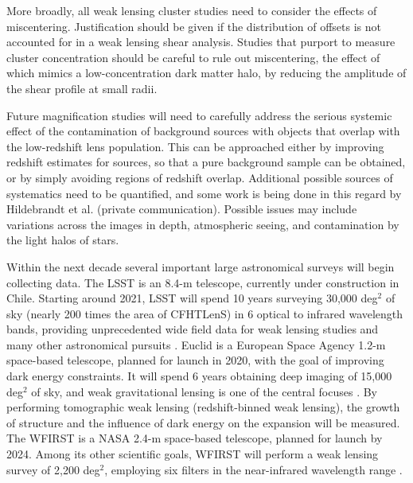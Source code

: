 More broadly, all weak lensing cluster studies need to consider the effects of miscentering. Justification should be given if the distribution of offsets is not accounted for in a weak lensing shear analysis. Studies that purport to measure cluster concentration should be careful to rule out miscentering, the effect of which mimics a low-concentration dark matter halo, by reducing the amplitude of the shear profile at small radii. 

Future magnification studies will need to carefully address the serious systemic effect of the contamination of background sources with objects that overlap with the low-redshift lens population. This can be approached either by improving redshift estimates for sources, so that a pure background sample can be obtained, or by simply avoiding regions of redshift overlap. Additional possible sources of systematics need to be quantified, and some work is being done in this regard by Hildebrandt et al. (private communication). Possible issues may include variations across the images in depth, atmospheric seeing, and contamination by the light halos of stars.

Within the next decade several important large astronomical surveys will begin collecting data. The \acf{LSST} is an 8.4-m telescope, currently under construction in Chile. Starting around 2021, \ac{LSST} will spend 10 years surveying 30,000 deg$^2$ of sky (nearly 200 times the area of \ac{CFHTLenS}) in 6 optical to infrared wavelength bands, providing unprecedented wide field data for weak lensing studies and many other astronomical pursuits \citep{LSST2.0}. \acs{Euclid} is a European Space Agency 1.2-m space-based telescope, planned for launch in 2020, with the goal of improving dark energy constraints. It will spend 6 years obtaining deep imaging of 15,000 deg$^2$ of sky, and weak gravitational lensing is one of the central focuses \citep{Euclid}. By performing tomographic weak lensing (redshift-binned weak lensing), the growth of structure and the influence of dark energy on the expansion will be measured. The \acf{WFIRST} is a NASA 2.4-m space-based telescope, planned for launch by 2024. Among its other scientific goals, \ac{WFIRST} will perform a weak lensing survey of 2,200 deg$^2$, employing six filters in the near-infrared wavelength range \citep{WFIRST}. 


